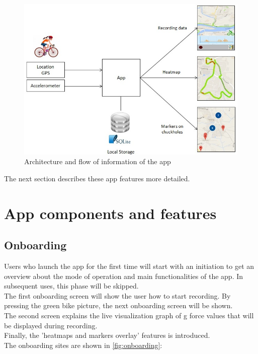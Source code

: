 \documentclass[10pt,a4paper]{article} %
\begin{document}
	\begin{figure}[H]
	\centering
    	\includegraphics[scale = 0.8]{pic1}
    	\caption{Architecture and flow of information of the app }
	\label{fig:arch_flow}
    	\end{figure}
    
	\noindent
	The next section describes these app features more detailed.
    
    \section{App components and features}
    
    
    \subsection{Onboarding}
    	Users who launch the app for the first time will start with an initiation to get an overview about the mode of operation and main functionalities of the app. In subsequent uses, this phase will be skipped.\\
    	The first onboarding screen will show the user how to start recording. By pressing the green bike picture, the next onboarding screen will be shown. \\
    	The second screen explains the live visualization graph of g force values that will be displayed during recording.\\
    	Finally, the 'heatmaps and markers overlay' features is introduced.\\
	The onboarding sites are shown in \autoref{fig:onboarding}:
    
\end{document}
